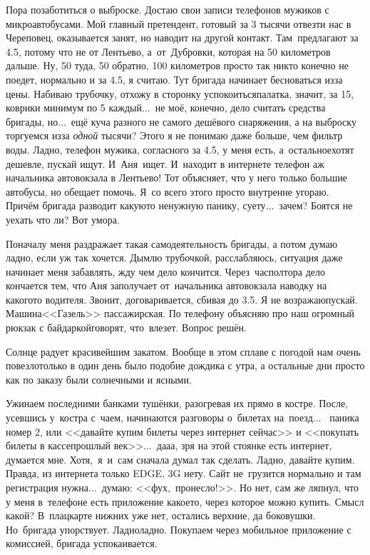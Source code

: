 Пора позаботиться о выброске. Достаю свои записи телефонов мужиков с микроавтобусами. Мой главный претендент, готовый за 3 тысячи отвезти нас в Череповец, оказывается занят, но наводит на другой контакт. Там~предлагают за 4.5, потому что не от Лентьево, а~от~Дубровки, которая на 50 километров дальше. Ну, 50 туда, 50 обратно, 100 километров просто так никто конечно не поедет, нормально и за 4.5, я считаю. Тут бригада начинает бесноваться из\sdash за цены. Набиваю трубочку, отхожу в сторонку успокоиться\mdash палатка, значит, за 15, коврики минимум по 5 каждый$\ldots$~не моё, конечно, дело считать средства бригады, но$\ldots$~ещё куча разного не самого дешёвого снаряжения, а на выброску торгуемся из\sdash за \textit{одной} тысячи? Этого я не понимаю даже больше, чем фильтр воды. Ладно, телефон  мужика, согласного за 4.5, у  меня есть, а~остальное\mdash хотят дешевле, пускай ищут. И~Аня~ищет. И~находит в интернете телефон аж начальника автовокзала в Лентьево! Тот объясняет, что у него только большие автобусы, но обещает помочь. Я~со всего этого просто внутренне угораю. Причём бригада разводит какую\sdash то ненужную панику, суету$\ldots$~зачем? Боятся не уехать что ли? Вот умора.

Поначалу меня раздражает такая самодеятельность бригады, а потом думаю ладно, если уж так хочется. Дымлю трубочкой, расслабляюсь, ситуация даже начинает меня забавлять, жду чем дело кончится. Через~час\sdash полтора дело кончается тем, что Аня заполучает от~начальника автовокзала наводку на какого\sdash то водителя. Звонит, договаривается, сбивая до 3.5. Я не возражаю\mdash пускай. Машина\mdash <<Газель>> пассажирская. По телефону объясняю про наш огромный рюкзак с байдаркой\mdash говорят, что~влезет. Вопрос решён.

Солнце радует красивейшим закатом. Вообще в этом сплаве с погодой нам очень повезло\mdash только в один день было подобие дождика с утра, а остальные дни просто как по заказу были солнечными и ясными.

Ужинаем последними банками тушёнки, разогревая их прямо в костре. После, усевшись у~костра с~чаем, начинаются разговоры о~билетах на~поезд$\ldots$~ паника номер 2, или <<давайте купим билеты через интернет сейчас>> и <<покупать билеты в кассе\mdash прошлый век>>$\ldots$~да\sdash а\sdash а, зря на этой стоянке есть интернет, думается мне. Хотя,~я~и~сам сначала думал так сделать. Ладно, давайте купим. Правда, из интернета только EDGE, 3G нету. Сайт не~грузится нормально и там регистрация нужна$\ldots$~думаю: <<фух,~пронесло!>>. Но нет, сам же ляпнул, что у меня в~телефоне есть приложение какое\sdash то, через которое можно купить. Смысл какой? В~плацкарте нижних уже нет, остались верхние, да боковушки. Но~бригада упорствует. Ладно\sdash ладно. Покупаем через мобильное приложение с комиссией, бригада успокаивается. 

